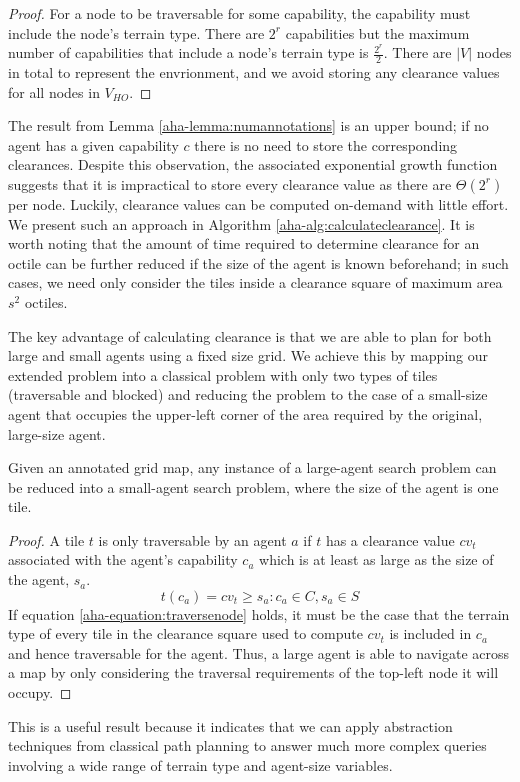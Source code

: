 \begin{proof}
For a node to be traversable for some capability, the capability must include the node's terrain type. 
There are $2^r$ capabilities but the maximum number of capabilities that include a node's terrain type is $\frac{2^r}{2}$. 
There are $|V|$ nodes in total to represent the envrionment, and we avoid storing any clearance values for all nodes in $V_{HO}$. 
\end{proof}

The result from Lemma \ref{aha-lemma:numannotations} is an upper bound; if no agent has a given capability $c$ there is no need to store the corresponding clearances.
Despite this observation, the associated exponential growth function suggests that it is impractical to store every clearance value as there are $\Theta(2^r)$ per node.
Luckily, clearance values can be computed on-demand with little effort. 
We present such an approach in Algorithm \ref{aha-alg:calculateclearance}. 
It is worth noting that the amount of time required to determine clearance for an octile can be further reduced if the size of the agent is known beforehand; in such cases, we need only consider the tiles inside a clearance square of maximum area $s^2$ octiles.

\par \indent
The key advantage of calculating clearance is that we are able to plan for both large and small agents using a fixed size grid. 
We achieve this by mapping our extended problem into a classical problem with only two types of tiles (traversable and blocked) and reducing the problem to the case of a small-size agent that occupies the upper-left corner of the area required by the original, large-size agent. 
\begin{theorem}
\label{aha-theorem:reducibility}
Given an annotated grid map, any instance of a large-agent search problem can be reduced into a small-agent search problem, where the size of the agent is one tile.
\end{theorem}

\begin{proof}
A tile $t$ is only traversable by an agent $a$ if $t$ has a clearance value $cv_{t}$ associated with the agent's capability $c_{a}$ which is at least as large as the size of the agent, $s_{a}$. 
\begin{equation}
\label{aha-equation:traversenode}
t(c_{a}) = cv_{t} \geq s_{a} : c_{a} \in C, s_{a} \in S
\end{equation}
If equation \ref{aha-equation:traversenode} holds, it must be the case that the terrain type of every tile in the clearance square used to compute $cv_{t}$ is included in $c_{a}$ and hence traversable for the agent. 
Thus, a large agent is able to navigate across a map by only considering the traversal requirements of the top-left node it will occupy.
\end{proof}
This is a useful result because it indicates that we can apply abstraction techniques from classical path planning to answer much more complex queries involving a wide range of terrain type and agent-size variables.
